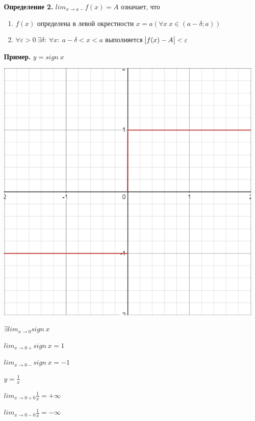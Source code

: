\documentclass{article}
\begin{document}
  \textbf{Определение 2.} \( lim_{x \rightarrow a-} f(x) = A \) означает, что
  \begin{enumerate}
    \item \(f(x)\) определена в левой окрестности \(x=a(\forall x\ x \in (a-\delta; a))\)
    \item \( \forall \varepsilon > 0\ \exists \delta:\ \forall x:\ a - \delta < x < a \) выполняется \( \abs{f(x) - A} < \varepsilon \)
     \end{enumerate}

  \textbf{Пример.} \(y = sign\ x\)

  \includegraphics[scale=0.35]{11_1_2_1.png}
  
  \( \exists lim_{x \rightarrow 0} sign\ x \)

  \( lim_{x \rightarrow 0+} sign\ x = 1 \)

  \( lim_{x \rightarrow 0-} sign\ x = -1\)

  \( y = \frac{1}{x} \)

  \(lim_{x \rightarrow 0+0} \frac{1}{x} = +\infty\)

  \(lim_{x \rightarrow 0-0} \frac{1}{x} = -\infty\)
 
\end{document}
